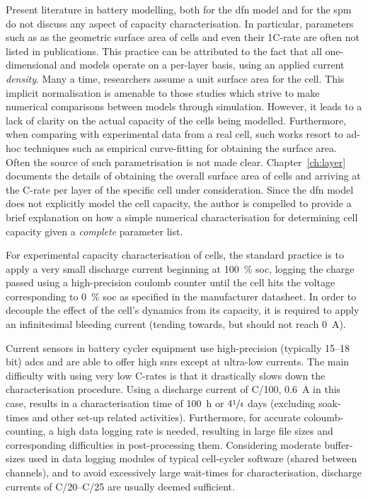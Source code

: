 Present literature  in battery modelling, both  for the \gls{dfn} model  and for
the  \gls{spm}  do not  discuss  any  aspect  of capacity  characterisation.  In
particular, parameters such  as as the geometric surface area  of cells and even
their  1C-rate are  often  not  listed in  publications.  This  practice can  be
attributed  to the  fact that  all one-dimensional  and   models
operate on  a per-layer basis, using  an applied current \emph{density}.  Many a
time,  researchers assume  a  unit  surface area  for  the  cell. This  implicit
normalisation  is amenable  to  those  studies which  strive  to make  numerical
comparisons between  models through simulation. However,  it leads to a  lack of
clarity on  the actual capacity of  the cells being modelled.  Furthermore, when
comparing with experimental  data from a real cell, such  works resort to ad-hoc
techniques such as empirical curve-fitting for obtaining the surface area. Often
the source  of such parametrisation  is not made  clear. Chapter~\cref{ch:layer}
documents  the details  of  obtaining  the overall  surface  area  of cells  and
arriving at the C-rate per layer of the specific cell under consideration. Since
the \gls{dfn}  model does  not explicitly  model the  cell capacity,  the author
is  compelled  to  provide  a  brief  explanation  on  how  a  simple  numerical
characterisation for determining cell capacity given a \emph{complete} parameter
list. 

For experimental capacity characterisation of cells, the standard practice is to
apply a very small discharge  current beginning at \SI{100}{\percent} \gls{soc},
logging the charge passed using a  high-precision coulomb counter until the cell
hits the voltage corresponding to \SI{0}{\percent} \gls{soc} as specified in the
manufacturer datasheet. In  order to decouple the effect of  the cell's dynamics
from its  capacity, it is  required to  apply an infinitesimal  bleeding current
(tending towards, but should not reach \SI{0}{\ampere}).

Current sensors in battery cycler equipment use high-precision (typically 15--18
bit) \glspl{adc}  and are  able to  offer high  \glspl{snr} except  at ultra-low
currents. The main difficulty with using very low C-rates is that it drastically
slows down the  characterisation procedure. Using a discharge  current of C/100,
\ie{}  \SI{0.6}{\ampere} in  this case,  results in  a characterisation  time of
\SI{100}{\hour} or \approx $4\sfrac{1}{4}$  days (excluding soak-times and other
set-up related  activities). Furthermore, for accurate  coloumb-counting, a high
data logging  rate is needed,  resulting in  large file sizes  and corresponding
difficulties in post-processing them.  Considering moderate buffer-sizes used in
data logging modules of typical  cell-cycler software (shared between channels),
and  to  avoid  excessively  large wait-times  for  characterisation,  discharge
currents of C/20--C/25 are usually deemed sufficient.

